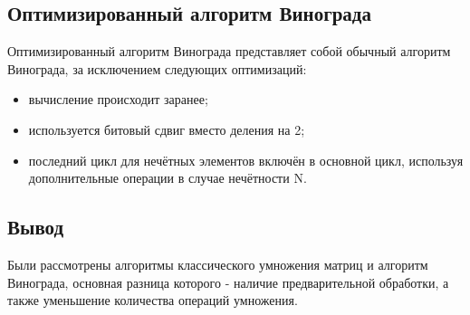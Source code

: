 \subsection{Оптимизированный алгоритм Винограда}
Оптимизированный алгоритм Винограда представляет собой обычный алгоритм Винограда, за исключением следующих оптимизаций:

\begin{itemize}
    \item вычисление происходит заранее;
    \item используется битовый сдвиг вместо деления на 2;
    \item последний цикл для нечётных элементов включён в основной цикл, используя дополнительные операции в случае нечётности N.
\end{itemize}

\subsection{Вывод}
Были рассмотрены алгоритмы классического умножения матриц и алгоритм Винограда, основная разница которого - наличие предварительной обработки, а также уменьшение количества операций умножения.